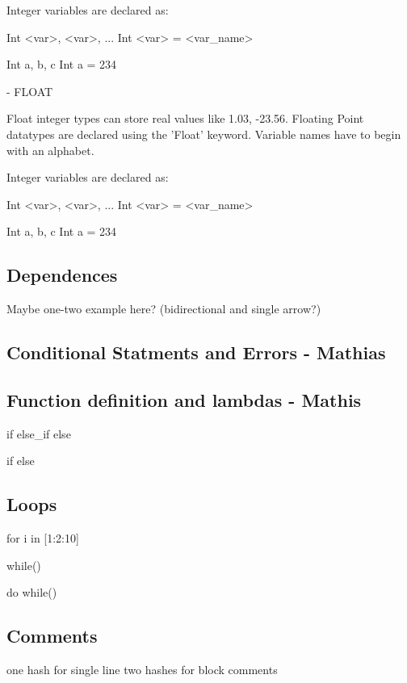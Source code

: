 Integer variables are declared as:

Int <var>, <var>, ...
Int <var> = <var_name>

Int a, b, c
Int a = 234


- FLOAT

Float integer types can store real values like 1.03, -23.56. Floating Point datatypes are declared using the 'Float' keyword. Variable names have to begin with an alphabet.

Integer variables are declared as:

Int <var>, <var>, ...
Int <var> = <var_name>

Int a, b, c
Int a = 234




\subsection{Dependences}
Maybe one-two example here? (bidirectional and single arrow?)

\subsection{Conditional Statments and Errors - Mathias}

\subsection{Function definition and lambdas - Mathis}

if {}
else\_if {}
else{}

if {}
else{}


\subsection{Loops}
for i in [1:2:10]{}

while(){}

do{}
while()



\subsection{Comments}
one hash for single line
two hashes for block comments


\label{sect:core}
